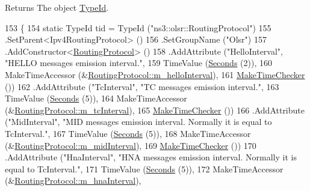 \begin{DoxyReturn}{Returns}
The object \hyperlink{classns3_1_1TypeId}{Type\+Id}. 
\end{DoxyReturn}

\begin{DoxyCode}
153 \{
154   \textcolor{keyword}{static} TypeId tid = TypeId (\textcolor{stringliteral}{"ns3::olsr::RoutingProtocol"})
155     .SetParent<Ipv4RoutingProtocol> ()
156     .SetGroupName (\textcolor{stringliteral}{"Olsr"})
157     .AddConstructor<\hyperlink{classns3_1_1olsr_1_1RoutingProtocol_a3415aee30083fbfc432e985ec1e68125}{RoutingProtocol}> ()
158     .AddAttribute (\textcolor{stringliteral}{"HelloInterval"}, \textcolor{stringliteral}{"HELLO messages emission interval."},
159                    TimeValue (\hyperlink{group__timecivil_ga33c34b816f8ff6628e33d5c8e9713b9e}{Seconds} (2)),
160                    MakeTimeAccessor (&\hyperlink{classns3_1_1olsr_1_1RoutingProtocol_ac973c86cbf21168c11cd7f16acc1ae4c}{RoutingProtocol::m\_helloInterval}),
161                    \hyperlink{group__time_ga7032965bd4afa578691d88c09e4481c1}{MakeTimeChecker} ())
162     .AddAttribute (\textcolor{stringliteral}{"TcInterval"}, \textcolor{stringliteral}{"TC messages emission interval."},
163                    TimeValue (\hyperlink{group__timecivil_ga33c34b816f8ff6628e33d5c8e9713b9e}{Seconds} (5)),
164                    MakeTimeAccessor (&\hyperlink{classns3_1_1olsr_1_1RoutingProtocol_ae282dcb4112be0b4f2ac8f413b022fa9}{RoutingProtocol::m\_tcInterval}),
165                    \hyperlink{group__time_ga7032965bd4afa578691d88c09e4481c1}{MakeTimeChecker} ())
166     .AddAttribute (\textcolor{stringliteral}{"MidInterval"}, \textcolor{stringliteral}{"MID messages emission interval.  Normally it is equal to TcInterval."},
167                    TimeValue (\hyperlink{group__timecivil_ga33c34b816f8ff6628e33d5c8e9713b9e}{Seconds} (5)),
168                    MakeTimeAccessor (&\hyperlink{classns3_1_1olsr_1_1RoutingProtocol_a9109a692ebfe241e01a68a584a4961b9}{RoutingProtocol::m\_midInterval}),
169                    \hyperlink{group__time_ga7032965bd4afa578691d88c09e4481c1}{MakeTimeChecker} ())
170     .AddAttribute (\textcolor{stringliteral}{"HnaInterval"}, \textcolor{stringliteral}{"HNA messages emission interval.  Normally it is equal to TcInterval."},
171                    TimeValue (\hyperlink{group__timecivil_ga33c34b816f8ff6628e33d5c8e9713b9e}{Seconds} (5)),
172                    MakeTimeAccessor (&\hyperlink{classns3_1_1olsr_1_1RoutingProtocol_a0d117664d5991c4b405b9ef14c33ea23}{RoutingProtocol::m\_hnaInterval}),

\end{DoxyCode}

